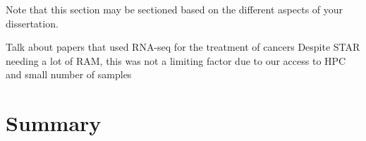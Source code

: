 Note that this section may be sectioned based on the different aspects of your dissertation.

Talk about papers that used RNA-seq for the treatment of cancers
Despite STAR needing a lot of RAM, this was not a limiting factor due to our access to \ac{HPC} and small number of samples








\section{Summary}

